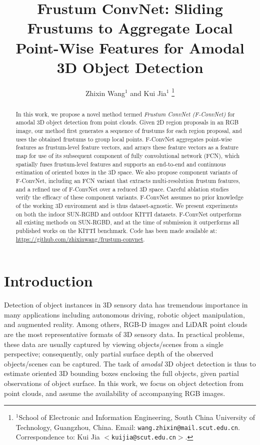 \documentclass[letterpaper, 10 pt, conference]{ieeeconf}
\title{\LARGE \bf
Frustum ConvNet: Sliding Frustums to Aggregate Local Point-Wise Features for Amodal 3D Object Detection
}
\author{Zhixin Wang$^{1}$  and Kui Jia$^{1}$  \thanks{$^{1}$School of Electronic and Information Engineering, South China University of Technology, Guangzhou, China.
		Email: {\tt\small wang.zhixin@mail.scut.edu.cn}.
		\newline Correspondence to: Kui Jia {\tt\small $<$kuijia@scut.edu.cn$>$}.}
}
\begin{document}
\maketitle
\thispagestyle{empty}
\pagestyle{empty}


\begin{abstract}
	In this work, we propose a novel method termed \emph{Frustum ConvNet (F-ConvNet)} for amodal 3D object detection from point clouds. Given 2D region proposals in an RGB image, our method first generates a sequence of frustums for each region proposal, and uses the obtained frustums to group local points. F-ConvNet aggregates point-wise features as frustum-level feature vectors, and arrays these feature vectors as a feature map for use of its subsequent component of fully convolutional network (FCN), which spatially fuses frustum-level features and supports an end-to-end and continuous estimation of oriented boxes in the 3D space. We also propose component variants of F-ConvNet, including an FCN variant that extracts multi-resolution frustum features, and a refined use of F-ConvNet over a reduced 3D space. Careful ablation studies verify the efficacy of these component variants. F-ConvNet assumes no prior knowledge of the working 3D environment and is thus dataset-agnostic. We present experiments on both the indoor SUN-RGBD and outdoor KITTI datasets. F-ConvNet outperforms all existing methods on SUN-RGBD, and at the time of submission it outperforms all published works on the KITTI benchmark. Code has been made available at: {\url{https://github.com/zhixinwang/frustum-convnet}.}
\end{abstract}



\section{Introduction}
\label{SecIntro}

Detection of object instances in 3D sensory data has tremendous importance in many applications including autonomous driving, robotic object manipulation, and augmented reality. Among others, RGB-D images and LiDAR point clouds are the most representative formats of 3D sensory data. In practical problems, these data are usually captured by viewing objects/scenes from a single perspective; consequently, only partial surface depth of the observed objects/scenes can be captured. The task of \emph{amodal} 3D object detection is thus to estimate oriented 3D bounding boxes enclosing the full objects, given partial observations of object surface. In this work, we focus on object detection from point clouds, and assume the availability of accompanying RGB images.
\end{document}
